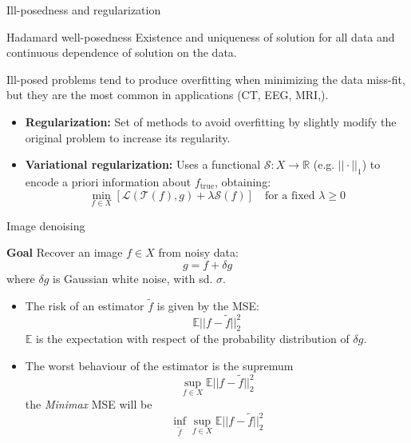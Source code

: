 \begin{frame}{Ill-posedness and regularization}


\begin{block}{Hadamard well-posedness}
 Existence and uniqueness of solution for all data and continuous dependence of solution on the data.
\end{block}

\begin{block}{}
Ill-posed problems tend to produce overfitting when minimizing the data miss-fit, but they are the most common in applications (CT, EEG, MRI,\textellipsis).
\end{block}

\bigskip
\pause
\begin{itemize}
\item \textbf{Regularization:} Set of methods to avoid overfitting by slightly modify the original problem to increase its regularity.

\bigskip
\pause
\item \textbf{Variational regularization:} Uses a functional $\mathcal{S}:X\longrightarrow \mathbb{R}$ (e.g. $||\cdot||_1$) to encode a priori information about $f_{\text{true}}$, obtaining:
$$
\min_{f\in X}\left[\mathcal{L}(\mathcal{T}(f),g)+\lambda \mathcal{S}(f)\right]\quad \text{for a fixed $\lambda\geq 0$}
$$

\end{itemize}
\end{frame}



\begin{frame}{Image denoising}
\begin{block}{\textbf{Goal}}
 Recover an image $f\in X$ from noisy data:
$$
g = f+\delta g
$$
where $\delta g$ is Gaussian white noise, with sd. $\sigma$.
\end{block}

\pause
\bigskip
\begin{itemize}
\item The risk of an estimator $\tilde{f}$ is given by the MSE:
$$
\mathbb{E}||f-\tilde{f}||_2^2
$$
$\mathbb{E}$ is the expectation with respect of the probability distribution of $\delta g$.
\pause
\bigskip
\item The worst behaviour of the estimator is the supremum
$$
\sup_{f\in X} \mathbb{E}||f-\tilde{f}||_2^2
$$
the \textit{Minimax} MSE will be
$$
\inf_{\tilde{f}}\sup_{f\in X}\mathbb{E}||f-\tilde{f}||^2_2
$$

\end{itemize}
\end{frame}

